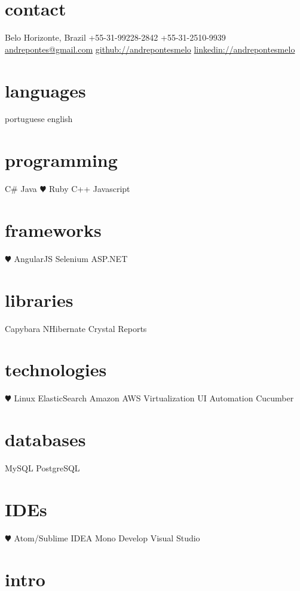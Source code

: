 \documentclass[]{friggeri-cv}
\begin{document}


\begin{aside}
\section{contact}
Belo Horizonte, Brazil
+55-31-99228-2842
+55-31-2510-9939
~
\href{mailto:andrepontes@gmail.com}{andrepontes@gmail.com}
\href{https://github.com/andrepontesmelo}{github://andrepontesmelo}
\href{https://br.linkedin.com/in/andrepontesmelo}{linkedin://andrepontesmelo}
\section{languages}
portuguese
english
\section{programming}
C\#
Java
{\color{red} $\varheartsuit$} Ruby
C++
Javascript
\section{frameworks}
{\color{red} $\varheartsuit$} AngularJS
Selenium
ASP.NET
\section{libraries}
Capybara
NHibernate
Crystal Reports
\section{technologies}
 {\color{red} $\varheartsuit$} Linux
ElasticSearch
Amazon AWS
Virtualization
UI Automation
Cucumber
\section{databases}
MySQL
PostgreSQL
\section{IDEs}
{\color{red} $\varheartsuit$} Atom/Sublime
IDEA
Mono Develop
Visual Studio
\end{aside}
\section{intro}
\end{document}
